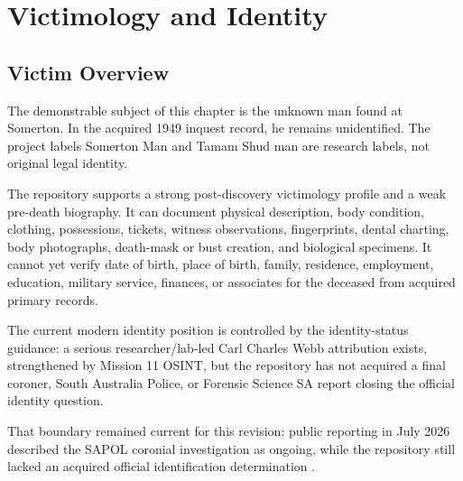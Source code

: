 \chapter{Victimology and Identity}
\label{chap:victimology-and-identity}


\section{Victim Overview}

The demonstrable subject of this chapter is the unknown man found at Somerton. In the acquired 1949 inquest record, he remains unidentified. The project labels Somerton Man and Tamam Shud man are research labels, not original legal identity.

The repository supports a strong post-discovery victimology profile and a weak pre-death biography. It can document physical description, body condition, clothing, possessions, tickets, witness observations, fingerprints, dental charting, body photographs, death-mask or bust creation, and biological specimens. It cannot yet verify date of birth, place of birth, family, residence, employment, education, military service, finances, or associates for the deceased from acquired primary records.

The current modern identity position is controlled by the identity-status guidance: a serious researcher/lab-led Carl Charles Webb attribution exists, strengthened by Mission 11 OSINT, but the repository has not acquired a final coroner, South Australia Police, or Forensic Science SA report closing the official identity question.

That boundary remained current for this revision: public reporting in July 2026 described the SAPOL coronial investigation as ongoing, while the repository still lacked an acquired official identification determination \parencite{m11-m11-src-0001}.

